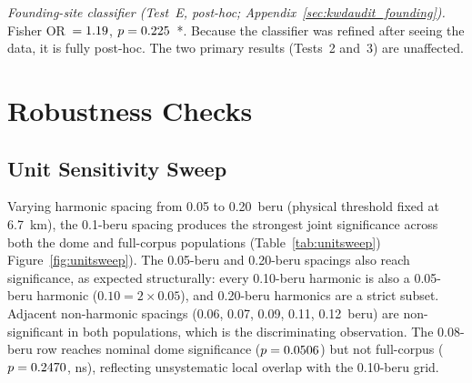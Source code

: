 \documentclass[HARVARD,twocolumn]{USG}
\begin{document}
\noindent\textit{Founding-site classifier (Test~E, post-hoc;
Appendix~\ref{sec:kwdaudit_founding}).}
Fisher OR~$= 1.19$, $p = 0.225$~*.
Because the classifier was refined after seeing the data, it is
fully post-hoc. The two primary results (Tests~2 and~3) are unaffected.

\section{Robustness Checks}
\label{sec:robustness}

\subsection{Unit Sensitivity Sweep}
\label{sec:metrology}

Varying harmonic spacing from 0.05 to 0.20~beru (physical threshold
fixed at 6.7~km), the 0.1-beru spacing produces the strongest joint
significance across both the dome and full-corpus populations
(Table~\ref{tab:unitsweep}) Figure~\ref{fig:unitsweep}). The 0.05-beru and 0.20-beru spacings also
reach significance, as expected structurally: every 0.10-beru harmonic is
also a 0.05-beru harmonic ($0.10 = 2 \times 0.05$), and 0.20-beru harmonics
are a strict subset. Adjacent non-harmonic spacings (0.06, 0.07, 0.09, 0.11,
0.12~beru) are non-significant in both populations, which is the
discriminating observation. The 0.08-beru row reaches nominal
dome significance ($p = 0.0506$) but not full-corpus ($p = 0.2470$, ns),
reflecting unsystematic local overlap with the 0.10-beru grid.
\end{document}
